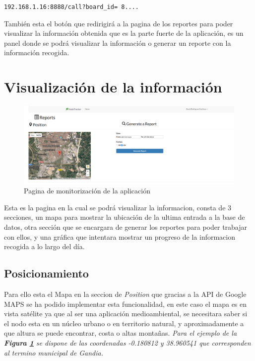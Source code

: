 \begin{lstlisting}[caption=Ejemplo para una ID diferente, label=getstringexaple]
192.168.1.16:8888/call?board_id= 8....
\end{lstlisting}

También esta el botón que redirigirá a la pagina de los reportes para poder visualizar la información obtenida que es la parte fuerte de la aplicación, es un panel donde se podrá visualizar la información o generar un reporte con la información recogida.
\clearpage

\section{Visualización  de la información}

\begin{figure}[!h]
	\centering
	\includegraphics[width=1.0\linewidth]{figuras/nodereport}
	\caption{Pagina de monitorización de la aplicación}
	\label{fig:nodereport}
\end{figure}

Esta es la pagina en la cual se podrá visualizar la informacion, consta de 3 secciones, un mapa para mostrar la ubicación de la ultima entrada a la base de datos, otra sección que se encargara de generar los reportes para poder trabajar con ellos, y una gráfica que intentara mostrar un progreso de la informacion recogida a lo largo del día.

\subsection{Posicionamiento}

Para ello esta el Mapa en la seccion de \textit{Position} que gracias a la API de Google MAPS se ha podido implementar esta funcionalidad, en este caso el mapa es en vista satélite ya que al ser una aplicación medioambiental, se necesitara saber si el nodo esta en un núcleo urbano o en territorio natural, y aproximadamente a que altura se puede encontrar, costa o altas montañas. \textit{Para el ejemplo de la \textbf{Figura \ref{fig:nodereport}} se dispone de las coordenadas -0.180812 y 38.960541 que corresponden al termino municipal de Gandia.} 

